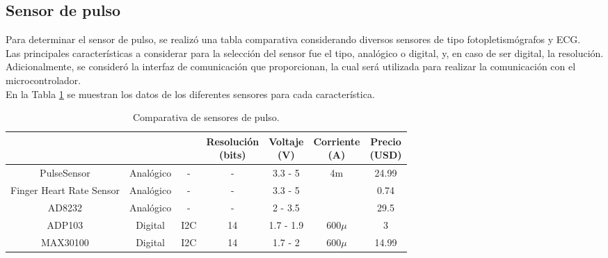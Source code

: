 
\subsection{Sensor de pulso}
Para determinar el sensor de pulso, se realizó una tabla comparativa considerando diversos sensores de tipo fotopletismógrafos y ECG. \\

Las principales características a considerar para la selección del sensor fue el tipo, analógico o digital, y, en caso de ser digital, la resolución. Adicionalmente, se consideró la interfaz de comunicación que proporcionan, la cual será utilizada para realizar la comunicación con el microcontrolador.\\

En la Tabla \ref{analisis:sensorPulso} se muestran los datos de los diferentes sensores para cada característica.



\begin{table}[htbp]
	\begin{center}
		\begin{tabular}{|c|c|c|c|c|c|c|}
			\hline
			\thead{Modelo}&\thead{Tipo}&\thead{Interfaz}&\thead{Resolución \\ (bits)}&\thead{Voltaje \\ (V)}& \thead{Corriente \\ (A)}&\thead{Precio\\ (USD)}\\
			\hline
			\hline
			PulseSensor & Analógico&-&-& 3.3 - 5&4m&24.99 \\
			\hline
			Finger Heart Rate Sensor & Analógico& -&- & 3.3 - 5&&0.74 \\
			\hline
			AD8232 & Analógico& -& - & 2 - 3.5&&29.5 \\
			\hline
			ADP103 & Digital& I2C& 14 & 1.7 - 1.9&$600\mu$&3 \\
			\hline
			MAX30100 & Digital& I2C &14 & 1.7 - 2&$600\mu$&14.99 \\
			\hline
		\end{tabular}
		\caption{Comparativa de sensores de pulso.}
		\label{analisis:sensorPulso}
	\end{center}
\end{table}


\pagebreak